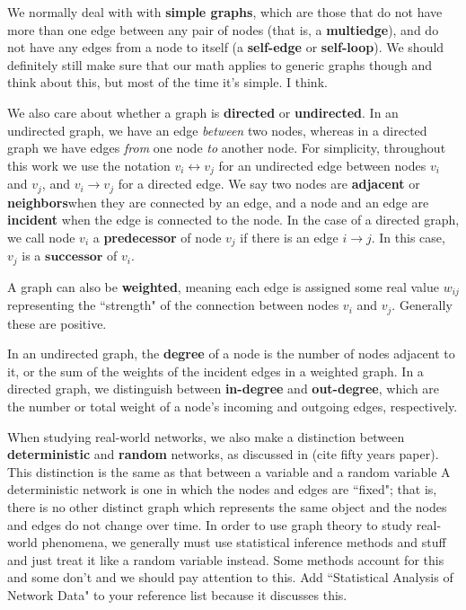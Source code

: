 \documentclass[12pt]{thesis}
\theoremstyle{plain}
\theoremstyle{definition}
\theoremstyle{remark}
\begin{document}
We normally deal with with \textbf{simple graphs}, which are those that do not have more than one edge between any pair of nodes (that is, a \textbf{multiedge}), and do not have any edges from a node to itself (a \textbf{self-edge} or \textbf{self-loop}). We should definitely still make sure that our math applies to generic graphs though and think about this, but most of the time it's simple. I think.

We also care about whether a graph is \textbf{directed} or \textbf{undirected}. In an undirected graph, we have an edge \textit{between} two nodes, whereas in a directed graph we have edges \textit{from} one node \textit{to} another node. For simplicity, throughout this work we use the notation $v_i \leftrightarrow v_j$ for an undirected edge between nodes $v_i$ and $v_j$, and $v_i \rightarrow v_j$ for a directed edge. We say two nodes are \textbf{adjacent} or \textbf{neighbors}\index when they are connected by an edge, and a node and an edge are \textbf{incident} when the edge is connected to the node. In the case of a directed graph, we call node $v_i$ a \textbf{predecessor} of node $v_j$ if there is an edge $i\rightarrow j$. In this case, $v_j$ is a $\textbf{successor}$ of $v_i$.

A graph can also be \textbf{weighted}, meaning each edge is assigned some real value $w_{ij}$ representing the ``strength" of the connection between nodes $v_i$ and $v_j$. Generally these are positive.

In an undirected graph, the \textbf{degree} of a node is the number of nodes adjacent to it, or the sum of the weights of the incident edges in a weighted graph. In a directed graph, we distinguish between \textbf{in-degree} and \textbf{out-degree}, which are the number or total weight of a node's incoming and outgoing edges, respectively.

When studying real-world networks, we also make a distinction between \textbf{deterministic} and \textbf{random} networks, as discussed in (cite fifty years paper). This distinction is the same as that between a variable and a random variable A deterministic network is one in which the nodes and edges are ``fixed"; that is, there is no other distinct graph which represents the same object and the nodes and edges do not change over time. In order to use graph theory to study real-world phenomena, we generally must use statistical inference methods and stuff and just treat it like a random variable instead. Some methods account for this and some don't and we should pay attention to this. Add ``Statistical Analysis of Network Data" to your reference list because it discusses this.
\end{document}
